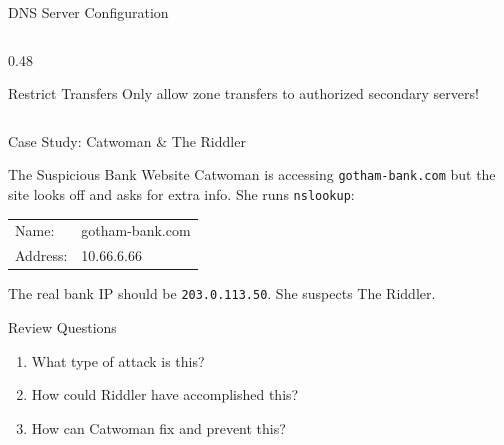\documentclass[aspectratio=169]{beamer}  %
\begin{document}
\begin{frame}{DNS Server Configuration}
\begin{columns}[T]
\begin{column}{0.48\textwidth}
            \vspace{0.2em}
            \begin{exampleblock}{Restrict Transfers}
                \small
                Only allow zone transfers to authorized secondary servers!
            \end{exampleblock}
        \end{column}
    \end{columns}
\end{frame}

\begin{frame}{Case Study: Catwoman \& The Riddler}
    \begin{casestudy}{The Suspicious Bank Website}
        \small
        Catwoman is accessing \texttt{gotham-bank.com} but the site looks off and asks for extra info. She runs \texttt{nslookup}:
        
        \vspace{0.2em}
        \ttfamily\footnotesize
        \begin{tabular}{l l}
            Name: & gotham-bank.com \\
            Address: & \textcolor{alertred}{10.66.6.66} \\
        \end{tabular}
        
        \vspace{0.2em}
        \normalfont\small
        The real bank IP should be \texttt{203.0.113.50}. She suspects The Riddler.
    \end{casestudy}
    
    \begin{block}{Review Questions}
        \small
        \begin{enumerate}\setlength{\itemsep}{1pt}
            \item What type of attack is this?
            \item How could Riddler have accomplished this?
            \item How can Catwoman fix and prevent this?
        \end{enumerate}
    \end{block}
\end{frame}
\end{document}
